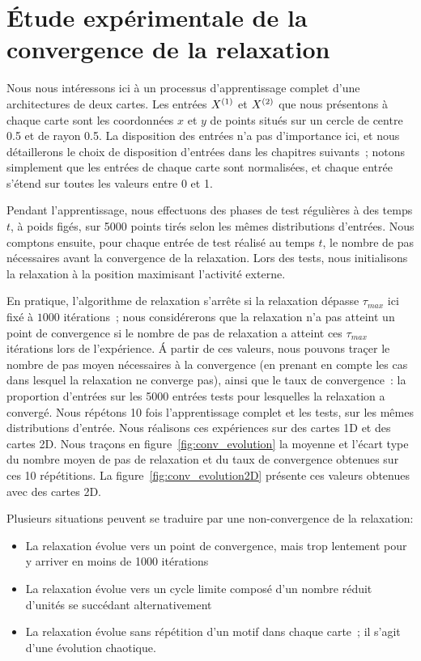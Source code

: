 \documentclass[../main]{subfiles}
\begin{document}
\section{\'Etude expérimentale de la convergence de la relaxation}

Nous nous intéressons ici  à un processus d'apprentissage complet d'une architectures de deux cartes. Les entrées $X^{({1})}$ et $X^{({2})}$ que nous présentons à chaque carte sont les coordonnées $x$ et $y$ de points situés sur un cercle de centre 0.5 et de rayon 0.5. La disposition des entrées n'a pas d'importance ici, et nous détaillerons le choix de disposition d'entrées dans les chapitres suivants~; notons simplement que les entrées de chaque carte sont normalisées, et chaque entrée s'étend sur toutes les valeurs entre 0 et 1. 

Pendant l'apprentissage, nous effectuons des phases de test régulières à des temps $t$, à poids figés, sur 5000 points tirés selon les mêmes distributions d'entrées. 
Nous comptons ensuite, pour chaque entrée de test réalisé au temps $t$, le nombre de pas nécessaires avant la convergence de la relaxation. Lors des tests, nous initialisons la relaxation à la position maximisant l'activité externe.

En pratique, l'algorithme de relaxation s'arrête si la relaxation dépasse $\tau_{max}$ ici fixé à $1000$ itérations~; nous considérerons que la relaxation n'a pas atteint un point de convergence si le nombre de pas de relaxation a atteint ces $\tau_{max}$ itérations lors de l'expérience. 
\'A partir de ces valeurs, nous pouvons traçer le nombre de pas moyen nécessaires à la convergence (en prenant en compte les cas dans lesquel la relaxation ne converge pas), ainsi que le taux de convergence~: la proportion d'entrées sur les 5000 entrées tests pour lesquelles la relaxation a convergé.
Nous répétons 10 fois l'apprentissage complet et les tests, sur les mêmes distributions d'entrée.
Nous réalisons ces expériences sur des cartes 1D et des cartes 2D.
Nous traçons en figure~\ref{fig:conv_evolution} la moyenne et l'écart type du nombre moyen de pas de relaxation et du taux de convergence obtenues sur ces 10 répétitions. La figure~\ref{fig:conv_evolution2D} présente ces valeurs obtenues avec des cartes 2D.

Plusieurs situations peuvent se traduire par une non-convergence de la relaxation:
\begin{itemize}
\item La relaxation évolue vers un point de convergence, mais trop lentement pour y arriver en moins de 1000 itérations
\item La relaxation évolue vers un cycle limite composé d'un nombre réduit d'unités se succédant alternativement
\item La relaxation évolue sans répétition d'un motif dans chaque carte~; il s'agit d'une évolution chaotique.
\end{itemize}
\end{document}
